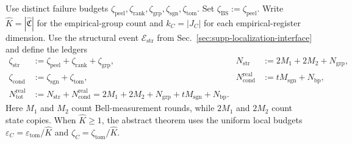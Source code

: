 \documentclass[
  aps,
  prx,
  reprint,
  superscriptaddress,
  amsmath,
  amssymb,
  nofootinbib,
  longbibliography
]{revtex4-2}
\begin{document}
Use distinct failure budgets
\(\zeta_{\mathrm{peel}},\zeta_{\mathrm{rank}},
\zeta_{\mathrm{grp}},\zeta_{\mathrm{sgn}},\zeta_{\mathrm{tom}}\).
Set \(\zeta_{\mathrm{BS}}:=\zeta_{\mathrm{peel}}\).
Write \(\widehat K=|\widehat{\mathfrak C}|\) for the empirical-group
count and \(k_C=|J_C|\) for each empirical-register dimension.
Use the structural event $\mathcal E_{\mathrm{str}}$ from
Sec.~\ref{sec:supp-localization-interface} and define the ledgers
\begin{align}
\zeta_{\mathrm{str}}
&:=\zeta_{\mathrm{peel}}+\zeta_{\mathrm{rank}}+\zeta_{\mathrm{grp}},
&N_{\mathrm{str}}&:=2M_1+2M_2+N_{\mathrm{grp}},
\label{eq:supp-end-to-end-structural-ledger}\\
\zeta_{\mathrm{cond}}
&:=\zeta_{\mathrm{sgn}}+\zeta_{\mathrm{tom}},
&N_{\mathrm{cond}}^{\mathrm{real}}&:=tM_{\mathrm{sgn}}+N_{\mathrm{bp}},
\label{eq:supp-end-to-end-conditional-ledger}\\
N_{\mathrm{tot}}^{\mathrm{real}}
&:=N_{\mathrm{str}}+N_{\mathrm{cond}}^{\mathrm{real}}
=2M_1+2M_2+N_{\mathrm{grp}}+tM_{\mathrm{sgn}}+N_{\mathrm{bp}}.
\label{eq:supp-block-product-main-copy-count}
\end{align}
Here \(M_1\) and \(M_2\) count Bell-measurement rounds, while \(2M_1\)
and \(2M_2\) count state copies.
When \(\widehat K\ge1\), the abstract theorem uses the uniform local budgets
\(\varepsilon_C=\varepsilon_{\mathrm{tom}}/\widehat K\) and
\(\zeta_C=\zeta_{\mathrm{tom}}/\widehat K\).
\end{document}
